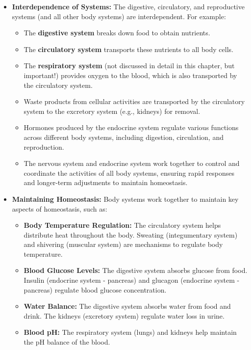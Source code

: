 \begin{itemize}
    \item \textbf{Interdependence of Systems:}  The digestive, circulatory, and reproductive systems (and all other body systems) are interdependent. For example:
    \begin{itemize}
        \item The \textbf{digestive system} breaks down food to obtain nutrients.
        \item The \textbf{circulatory system} transports these nutrients to all body cells.
        \item The \textbf{respiratory system} (not discussed in detail in this chapter, but important!) provides oxygen to the blood, which is also transported by the circulatory system.
        \item Waste products from cellular activities are transported by the circulatory system to the excretory system (e.g., kidneys) for removal.
        \item Hormones produced by the endocrine system regulate various functions across different body systems, including digestion, circulation, and reproduction.
        \item The nervous system and endocrine system work together to control and coordinate the activities of all body systems, ensuring rapid responses and longer-term adjustments to maintain homeostasis.
    \end{itemize}

    \item \textbf{Maintaining Homeostasis:}  Body systems work together to maintain key aspects of homeostasis, such as:
    \begin{itemize}
        \item \textbf{Body Temperature Regulation:}  The circulatory system helps distribute heat throughout the body.  Sweating (integumentary system) and shivering (muscular system) are mechanisms to regulate body temperature.
        \item \textbf{Blood Glucose Levels:}  The digestive system absorbs glucose from food. Insulin (endocrine system - pancreas) and glucagon (endocrine system - pancreas) regulate blood glucose concentration.
        \item \textbf{Water Balance:}  The digestive system absorbs water from food and drink. The kidneys (excretory system) regulate water loss in urine.
        \item \textbf{Blood pH:}  The respiratory system (lungs) and kidneys help maintain the pH balance of the blood.
    \end{itemize}


\end{itemize}
